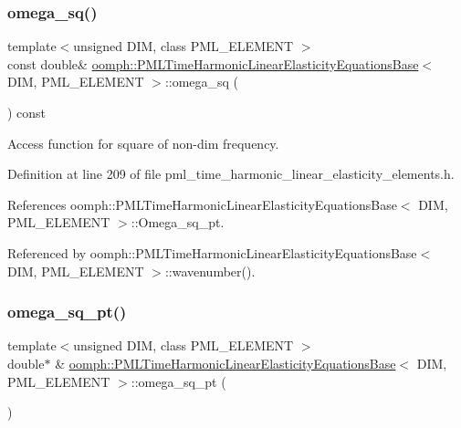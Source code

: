 \subsubsection{\texorpdfstring{omega\+\_\+sq()}{omega\_sq()}}
{\footnotesize\ttfamily template$<$unsigned D\+IM, class P\+M\+L\+\_\+\+E\+L\+E\+M\+E\+NT $>$ \\
const double\& \hyperlink{classoomph_1_1PMLTimeHarmonicLinearElasticityEquationsBase}{oomph\+::\+P\+M\+L\+Time\+Harmonic\+Linear\+Elasticity\+Equations\+Base}$<$ D\+IM, P\+M\+L\+\_\+\+E\+L\+E\+M\+E\+NT $>$\+::omega\+\_\+sq (\begin{DoxyParamCaption}{ }\end{DoxyParamCaption}) const\hspace{0.3cm}{\ttfamily [inline]}}



Access function for square of non-\/dim frequency. 



Definition at line 209 of file pml\+\_\+time\+\_\+harmonic\+\_\+linear\+\_\+elasticity\+\_\+elements.\+h.



References oomph\+::\+P\+M\+L\+Time\+Harmonic\+Linear\+Elasticity\+Equations\+Base$<$ D\+I\+M, P\+M\+L\+\_\+\+E\+L\+E\+M\+E\+N\+T $>$\+::\+Omega\+\_\+sq\+\_\+pt.



Referenced by oomph\+::\+P\+M\+L\+Time\+Harmonic\+Linear\+Elasticity\+Equations\+Base$<$ D\+I\+M, P\+M\+L\+\_\+\+E\+L\+E\+M\+E\+N\+T $>$\+::wavenumber().

\mbox{\label{classoomph_1_1PMLTimeHarmonicLinearElasticityEquationsBase_a36c27a51c1f3d5bc18de259ba64a491f}} 
\subsubsection{\texorpdfstring{omega\+\_\+sq\+\_\+pt()}{omega\_sq\_pt()}}
{\footnotesize\ttfamily template$<$unsigned D\+IM, class P\+M\+L\+\_\+\+E\+L\+E\+M\+E\+NT $>$ \\
double$\ast$ \& \hyperlink{classoomph_1_1PMLTimeHarmonicLinearElasticityEquationsBase}{oomph\+::\+P\+M\+L\+Time\+Harmonic\+Linear\+Elasticity\+Equations\+Base}$<$ D\+IM, P\+M\+L\+\_\+\+E\+L\+E\+M\+E\+NT $>$\+::omega\+\_\+sq\+\_\+pt (\begin{DoxyParamCaption}{ }\end{DoxyParamCaption})\hspace{0.3cm}{\ttfamily [inline]}}



